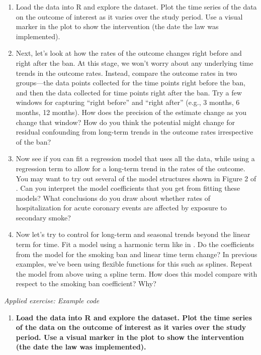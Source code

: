 \documentclass[
]{book}
\providecommand{\tightlist}{%
  \setlength{\itemsep}{0pt}\setlength{\parskip}{0pt}}
\begin{document}
\begin{enumerate}
\def\labelenumi{\arabic{enumi}.}
\tightlist
\item
  Load the data into R and explore the dataset. Plot the time series of the data on the outcome of interest as it varies over the study period. Use a visual marker in the plot to show the intervention (the date the law was implemented).
\item
  Next, let's look at how the rates of the outcome changes right before and right after the ban. At this stage, we won't worry about any underlying time trends in the outcome rates. Instead, compare the outcome rates in two groups---the data points collected for the time points right before the ban, and then the data collected for time points right after the ban. Try a few windows for capturing ``right before'' and ``right after'' (e.g., 3 months, 6 months, 12 months). How does the precision of the estimate change as you change that window? How do you think the potential might change for residual confounding from long-term trends in the outcome rates irrespective of the ban?
\item
  Now see if you can fit a regression model that uses all the data, while using a regression term to allow for a long-term trend in the rates of the outcome. You may want to try out several of the model structures shown in Figure 2 of \citet{bernal2017interrupted}. Can you interpret the model coefficients that you get from fitting these models? What conclusions do you draw about whether rates of hospitalization for acute coronary events are affected by exposure to secondary smoke?
\item
  Now let's try to control for long-term and seasonal trends beyond the linear term for time. Fit a model using a harmonic term like in \citet{bernal2017interrupted}. Do the coefficients from the model for the smoking ban and linear time term change? In previous examples, we've been using flexible functions for this such as splines. Repeat the model from above using a spline term. How does this model compare with respect to the smoking ban coefficient? Why?
\end{enumerate}

\emph{Applied exercise: Example code}

\begin{enumerate}
\def\labelenumi{\arabic{enumi}.}
\tightlist
\item
  \textbf{Load the data into R and explore the dataset. Plot the time series of the data on the outcome of interest as it varies over the study period. Use a visual marker in the plot to show the intervention (the date the law was implemented).}
\end{enumerate}
\end{document}
